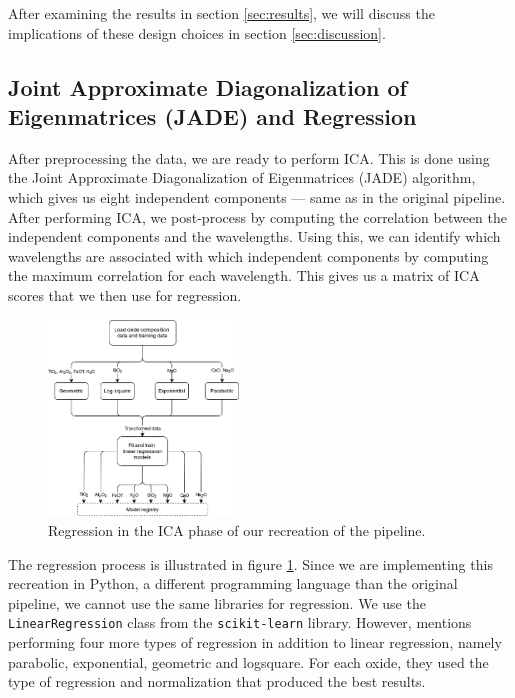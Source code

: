 After examining the results in section \ref{sec:results}, we will discuss the implications of these design choices in section \ref{sec:discussion}.

\subsection{Joint Approximate Diagonalization of Eigenmatrices (JADE) and Regression}
After preprocessing the data, we are ready to perform ICA.
This is done using the Joint Approximate Diagonalization of Eigenmatrices (JADE) algorithm, which gives us eight independent components --- same as in the original pipeline.
After performing ICA, we post-process by computing the correlation between the independent components and the wavelengths.
Using this, we can identify which wavelengths are associated with which independent components by computing the maximum correlation for each wavelength.
This gives us a matrix of ICA scores that we then use for regression.

\begin{figure}
	\centering
	\includegraphics[width=0.45\textwidth]{images/ica_regression.png}
	\caption{Regression in the ICA phase of our recreation of the pipeline.}
	\label{fig:ica_regression}
\end{figure}

The regression process is illustrated in figure \ref{fig:ica_regression}.
Since we are implementing this recreation in Python, a different programming language than the original pipeline, we cannot use the same libraries for regression.
We use the \texttt{LinearRegression} class from the \texttt{scikit-learn} library\cite{scikit-learn}.
However, \citeauthor{cleggRecalibrationMarsScience2017} mentions performing four more types of regression in addition to linear regression, namely parabolic, exponential, geometric and logsquare.
For each oxide, they used the type of regression and normalization that produced the best results.


